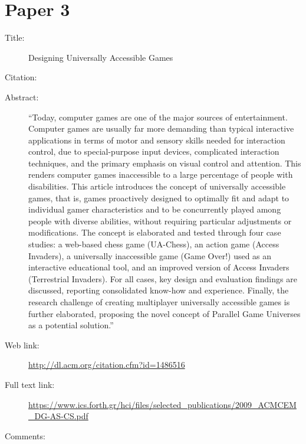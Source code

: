 \documentclass{scrartcl}
\begin{document}
\section*{Paper 3}
\begin{description}
\item[Title:] Designing Universally Accessible Games
\item[Citation:] \cite{Grammenos}
\item[Abstract:] ``Today, computer games are one of the major sources of entertainment. Computer games are usually far more demanding than typical interactive applications in terms of motor and sensory skills needed for interaction control, due to special-purpose input devices, complicated interaction techniques, and the primary emphasis on visual control and attention. This renders computer games inaccessible to a large percentage of people with disabilities. This article introduces the concept of universally accessible games, that is, games proactively designed to optimally fit and adapt to individual gamer characteristics and to be concurrently played among people with diverse abilities, without requiring particular adjustments or modifications. The concept is elaborated and tested through four case studies: a web-based chess game (UA-Chess), an action game (Access Invaders), a universally inaccessible game (Game Over!) used as an interactive educational tool, and an improved version of Access Invaders (Terrestrial Invaders). For all cases, key design and evaluation findings are discussed, reporting consolidated know-how and experience. Finally, the research challenge of creating multiplayer universally accessible games is further elaborated, proposing the novel concept of Parallel Game Universes as a potential solution.''
\item[Web link:] \url {http://dl.acm.org/citation.cfm?id=1486516}
\item[Full text link:] \url {https://www.ics.forth.gr/hci/files/selected_publications/2009_ACMCEM_DG-AS-CS.pdf}
\item[Comments:] 
\end{description}
\end{document}
